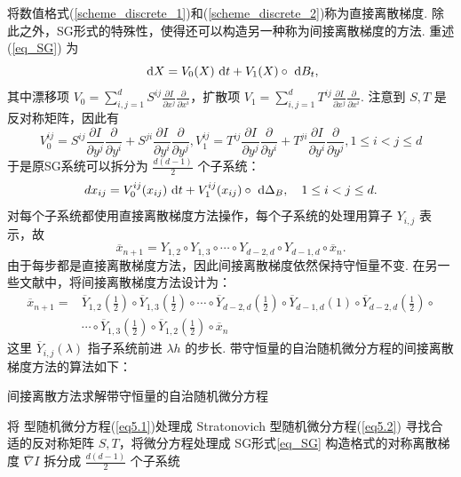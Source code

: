 将数值格式(\ref{scheme_discrete_1})和(\ref{scheme_discrete_2})称为直接离散梯度. 除此之外，SG形式的特殊性，使得还可以构造另一种称为间接离散梯度的方法. 重述(\ref{eq_SG}) 为
\[
\text{ d} X = V_0(X) \text{ d} t + V_1(X) \circ \text{ d} B_t,
\]
其中漂移项 $V_0 = \sum ^d_{i,j=1} S^{ij} \frac{\partial I}{\partial x^j}\frac{\partial}{\partial x^i}$，扩散项 $V_1 = \sum ^d_{i,j=1} T^{ij} \frac{\partial I}{\partial x^j}\frac{\partial}{\partial x^i}$. 注意到 $S,T$ 是反对称矩阵，因此有
\[
V_{0}^{i j}=S^{i j} \frac{\partial I}{\partial y^{j}} \frac{\partial}{\partial y^{i}}+S^{j i} \frac{\partial I}{\partial y^{i}} \frac{\partial}{\partial y^{j}}, V_{1}^{i j}=T^{i j} \frac{\partial I}{\partial y^{j}} \frac{\partial}{\partial y^{i}}+T^{j i} \frac{\partial I}{\partial y^{i}} \frac{\partial}{\partial y^{j}}, 1 \leq i<j \leq d
\]
于是原SG系统可以拆分为 $\frac{d(d-1)}{2}$ 个子系统：
\[
d x_{i j}=V_{0}^{i j}(x_{i j}) \text{ d} t+V_{1}^{i j}(x_{i j}) \circ \text{ d} \Delta_B, \quad 1 \leq i<j \leq d.
\]
对每个子系统都使用直接离散梯度方法操作，每个子系统的处理用算子 $Y_{i,j}$ 表示，故
\begin{equation}\label{scheme_discrete_3}
	\overline x_{n+1} = Y_{1,2}\circ Y_{1,3}\circ \cdots \circ Y_{d-2,d}\circ Y_{d-1,d} \circ \overline x_n. 
\end{equation}
由于每步都是直接离散梯度方法，因此间接离散梯度依然保持守恒量不变. 在另一些文献中，将间接离散梯度方法设计为：
\[
\begin{aligned}
\overline x_{n+1}=& \overline {Y}_{1,2}(\frac12) \circ \overline {Y}_{1,3}(\frac12) \circ \cdots \circ \overline {Y}_{d-2, d}(\frac12) \circ \overline {Y}_{d-1, d}(1) \circ \overline {Y}_{d-2, d}(\frac12) \circ \\
& \cdots \circ \overline {Y}_{1,3}(\frac12)\circ \overline {Y}_{1,2}(\frac12)\circ \overline x_n
\end{aligned}
\]
这里 $\overline Y_{i,j}(\lambda)$ 指子系统前进 $\lambda h$ 的步长. 
带守恒量的自治随机微分方程的间接离散梯度方法的算法如下：


\begin{algorithm}[!htbp]
	\caption{间接离散方法求解带守恒量的自治随机微分方程}%
	\LinesNumbered %
	将 \ito 型随机微分方程(\ref{eq5.1})处理成 Stratonovich 型随机微分方程(\ref{eq5.2})\;
	寻找合适的反对称矩阵 $S,T$，将微分方程处理成 SG形式\ref{eq_SG}\;
	构造格式的对称离散梯度 $\overline \nabla I$\;
	拆分成 $\frac{d(d-1)}{2}$ 个子系统\; 
\end{algorithm}


